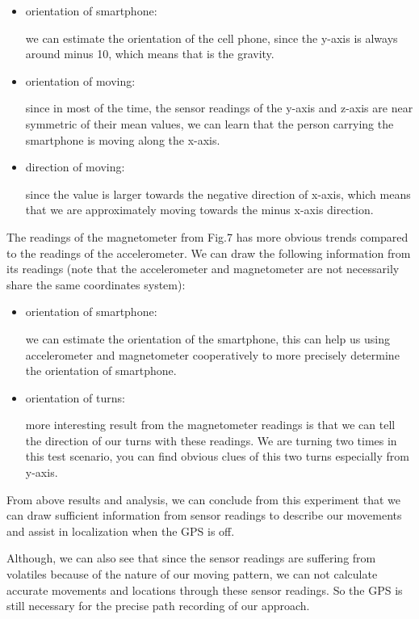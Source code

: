 \documentclass[journal]{IEEEtran}
\begin{document}
\begin{itemize}
	\item orientation of smartphone: 

		we can estimate the orientation of the cell phone, since the y-axis is always around minus 10, which means that is the gravity.
	\item orientation of moving: 

		since in most of the time, the sensor readings of the y-axis and z-axis are near symmetric of their mean values, we can learn that the person carrying the smartphone is moving along the x-axis.
	\item direction of moving: 

		since the value is larger towards the negative direction of x-axis, which means that we are approximately moving towards the minus x-axis direction.
\end{itemize}

The readings of the magnetometer from Fig.7 has more obvious trends compared to the readings of the accelerometer. 
We can draw the following information from its readings (note that the accelerometer and magnetometer are not necessarily share the same coordinates system):

\begin{itemize}
	\item orientation of smartphone: 

		we can estimate the orientation of the smartphone, this can help us using accelerometer and magnetometer cooperatively to more precisely determine the orientation of smartphone.
	\item orientation of turns: 

		more interesting result from the magnetometer readings is that we can tell the direction of our turns with these readings. 
		We are turning two times in this test scenario, you can find obvious clues of this two turns especially from y-axis.
\end{itemize}

From above results and analysis, we can conclude from this experiment that we can draw sufficient information from sensor readings to describe our movements and assist in localization when the GPS is off. 

Although, we can also see that since the sensor readings are suffering from volatiles because of the nature of our moving pattern, we can not calculate accurate movements and locations through these sensor readings.
So the GPS is still necessary for the precise path recording of our approach.
\end{document}

